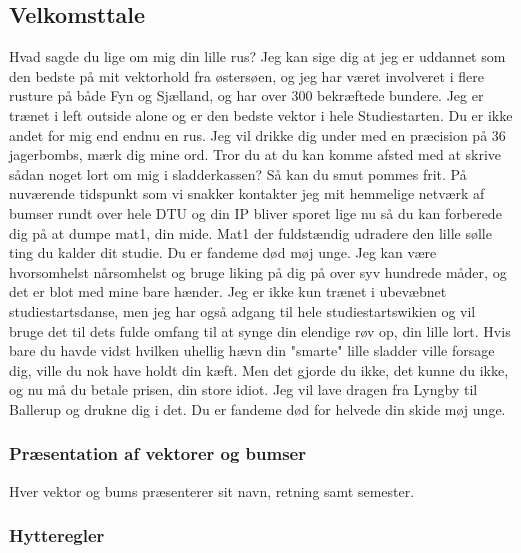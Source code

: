 \documentclass[../../../main.tex]{subfiles}
\begin{document}
\subsection{Velkomsttale}

Hvad sagde du lige om mig din lille rus? Jeg kan sige dig at jeg er uddannet som den bedste på mit vektorhold fra østersøen, og jeg har været involveret i flere rusture på både Fyn og Sjælland, og har over 300 bekræftede bundere. Jeg er trænet i left outside alone og er den bedste vektor i hele Studiestarten. Du er ikke andet for mig end endnu en rus. Jeg vil drikke dig under med en præcision på 36 jagerbombs, mærk dig mine ord. Tror du at du kan komme afsted med at skrive sådan noget lort om mig i sladderkassen? Så kan du smut pommes frit. På nuværende tidspunkt som vi snakker kontakter jeg mit hemmelige netværk af bumser rundt over hele DTU og din IP bliver sporet lige nu så du kan forberede dig på at dumpe mat1, din mide. Mat1 der fuldstændig udradere den lille sølle ting du kalder dit studie. Du er fandeme død møj unge. Jeg kan være hvorsomhelst nårsomhelst og bruge liking på dig på over syv hundrede måder, og det er blot med mine bare hænder. Jeg er ikke kun trænet i ubevæbnet studiestartsdanse, men jeg har også adgang til hele studiestartswikien og vil bruge det til dets fulde omfang til at synge din elendige røv op, din lille lort. Hvis bare du havde vidst hvilken uhellig hævn din "smarte" lille sladder ville forsage dig, ville du nok have holdt din kæft. Men det gjorde du ikke, det kunne du ikke, og nu må du betale prisen, din store idiot. Jeg vil lave dragen fra Lyngby til Ballerup og drukne dig i det. Du er fandeme død for helvede din skide møj unge.

\subsubsection{Præsentation af vektorer og bumser}
Hver vektor og bums præsenterer sit navn, retning samt semester.


\subsubsection{Hytteregler}
\end{document}
